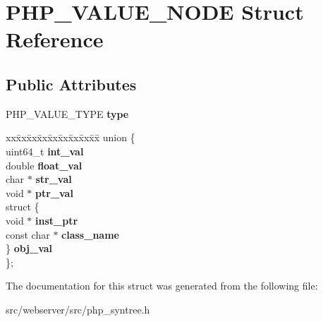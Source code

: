 \section{PHP\_\-VALUE\_\-NODE Struct Reference}
\label{structPHP__VALUE__NODE}
\subsection*{Public Attributes}
\begin{DoxyCompactItemize}
\item 
PHP\_\-VALUE\_\-TYPE {\bfseries type}\label{structPHP__VALUE__NODE_a2daba55856e60f08c20abbb66989aaf1}

\item 
\begin{tabbing}
xx\=xx\=xx\=xx\=xx\=xx\=xx\=xx\=xx\=\kill
union \{\\
\>uint64\_t {\bfseries int\_val}\\
\>double {\bfseries float\_val}\\
\>char $\ast$ {\bfseries str\_val}\\
\>void $\ast$ {\bfseries ptr\_val}\\
\>struct \{\\
\>\>void $\ast$ {\bfseries inst\_ptr}\\
\>\>const char $\ast$ {\bfseries class\_name}\\
\>\} {\bfseries obj\_val}\\
\}; \label{structPHP__VALUE__NODE_a74d13a409d29153d03e6c5f7c235c822}
\\

\end{tabbing}\end{DoxyCompactItemize}


The documentation for this struct was generated from the following file:\begin{DoxyCompactItemize}
\item 
src/webserver/src/php\_\-syntree.h\end{DoxyCompactItemize}
